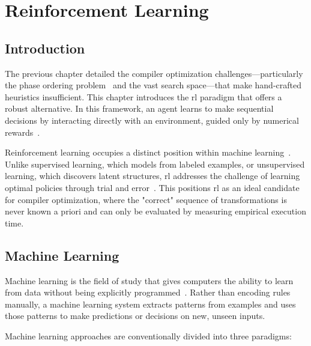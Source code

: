 \chapter{Reinforcement Learning}
\label{ch:rl-foundations}

\section{Introduction}

The previous chapter detailed the compiler optimization challenges—particularly the phase ordering problem~\cite{touati2014phase} and the vast search space—that make hand-crafted heuristics insufficient. This chapter introduces the \gls{rl} paradigm that offers a robust alternative. In this framework, an agent learns to make sequential decisions by interacting directly with an environment, guided only by numerical rewards~\cite{sutton2018reinforcement}.

Reinforcement learning occupies a distinct position within machine learning~\cite{sutton2018reinforcement}. Unlike supervised learning, which models from labeled examples, or unsupervised learning, which discovers latent structures, \gls{rl} addresses the challenge of learning optimal policies through trial and error~\cite{sutton2018reinforcement}. This positions \gls{rl} as an ideal candidate for compiler optimization, where the "correct" sequence of transformations is never known a priori and can only be evaluated by measuring empirical execution time.

\section{Machine Learning}

Machine learning is the field of study that gives computers the ability to learn from data without being explicitly programmed~\cite{mitchell1997machine}. Rather than encoding rules manually, a machine learning system extracts patterns from examples and uses those patterns to make predictions or decisions on new, unseen inputs.

Machine learning approaches are conventionally divided into three paradigms:

